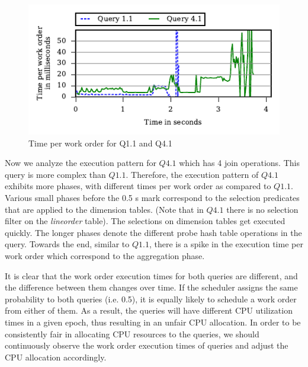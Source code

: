 \begin{figure}[h]
	\centering
	\includegraphics[width=\columnwidth]{policy/figures/q11-q41-time-per-wo.pdf}
	\vspace{-2.5em}
	\caption{Time per work order for Q1.1 and Q4.1}
	\label{fig:q1.1-q4.1-time-per-wo}
\end{figure}

Now we analyze the execution pattern for $Q4.1$ which has 4 join operations. 
This query is more complex than $Q1.1$.%
Therefore, the execution pattern of $Q4.1$ exhibits more phases, with different times per work order as compared to $Q1.1$.
Various small phases before the 0.5 s mark correspond to the selection predicates that are applied to the dimension tables. (Note that in $Q4.1$ there is no selection filter on the \textit{lineorder} table).
The selections on dimension tables get executed quickly.
The longer phases denote the different probe hash table operations in the query.
Towards the end, similar to $Q1.1$, there is a spike in the execution time per work order which correspond to the aggregation phase.

It is clear that the work order execution times for both queries are different, and the difference between them changes over time. 
If the scheduler assigns the same probability to both queries (i.e. 0.5), it is equally likely to schedule a work order from either of them. 
As a result, the queries will have different CPU utilization times in a given epoch, thus resulting in an unfair CPU allocation. 
In order to be consistently fair in allocating CPU resources to the queries, we should continuously observe the work order execution times of queries and adjust the CPU allocation accordingly. 

